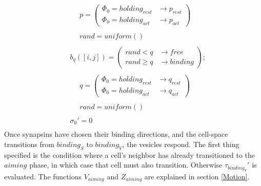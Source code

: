 \documentclass{acm_proc_article-sp}
\begin{document}
\begin{displaymath}
\begin{array}{l}
\hspace{16pt} \hspace{16pt} p = \left( \begin{array}{ll} \Phi_0 = holding_{rest} & \rightarrow p_{rest} \\
                                                         \Phi_0 = holding_{act}  & \rightarrow p_{act} \end{array} \right) \\
\\
\hspace{16pt} \hspace{16pt} rand = uniform() \\
\\
\hspace{16pt} b_q([i, j]) = \left( \begin{array}{ll} rand < q   & \rightarrow free \\
                                                     rand \ge q & \rightarrow binding \end{array} \right); \\
\\
\hspace{16pt} \hspace{16pt} q = \left( \begin{array}{ll} \Phi_0 = holding_{rest} & \rightarrow q_{rest} \\
                                                         \Phi_0 = holding_{act}  & \rightarrow q_{act} \end{array} \right) \\
\\
\hspace{16pt} \hspace{16pt} rand = uniform() \\
\\
\hspace{16pt} \sigma_0' = 0 \\
\end{array} \end{displaymath}
Once synapsins have chosen their binding directions, and
the cell-space transitions from $binding_S$ to $binding_V$,
the vesicles respond.  The first thing specified is the 
condition where a cell's neighbor has already transitioned
to the $aiming$ phase, in which case that cell must also
transition.  Otherwise $\tau_{binding_V}'$ is evaluated.
The functions $V_{aiming}$ and $Z_{aiming}$ are explained 
in section \ref{Motion}.
\end{document}
